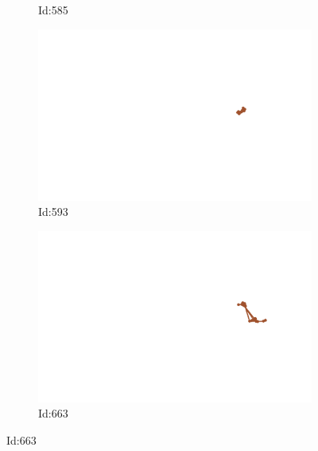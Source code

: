 \documentclass[12pt,twoside]{report}
\begin{document}
\begin{figure}
\begin{subfigure}[b]{0.20\textwidth}
\caption{Id:585}
\end{subfigure}
\begin{subfigure}[b]{0.20\textwidth}
\centering
\includegraphics[width=\textwidth]{../../trajectories/593.png}
\caption{Id:593}
\end{subfigure}
\begin{subfigure}[b]{0.20\textwidth}
\centering
\includegraphics[width=\textwidth]{../../trajectories/663.png}
\caption{Id:663}
\end{subfigure}
\end{figure}
\end{document}

